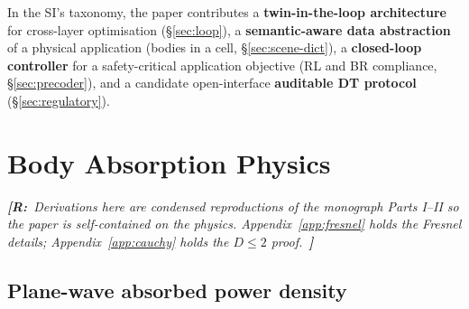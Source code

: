 \documentclass[journal,twocolumn,10pt]{IEEEtran}
\theoremstyle{definition}
\newcommand{\robinnote}[1]{%
  {\color{red!75!black}\textit{\textbf{[R:}~#1~\textbf{]}}}}
\begin{document}
In the SI's taxonomy, the paper contributes a
\textbf{twin-in-the-loop architecture} for cross-layer
optimisation (\S\ref{sec:loop}), a \textbf{semantic-aware data
abstraction} of a physical application (bodies in a cell,
\S\ref{sec:scene-dict}), a \textbf{closed-loop controller} for a
safety-critical application objective (RL and BR compliance,
\S\ref{sec:precoder}), and a candidate open-interface
\textbf{auditable DT protocol} (\S\ref{sec:regulatory}).

\section{Body Absorption Physics}\label{sec:physics}

\robinnote{Derivations here are condensed reproductions of the
monograph Parts I--II so the paper is self-contained on the
physics. Appendix~\ref{app:fresnel} holds the Fresnel details;
Appendix~\ref{app:cauchy} holds the $D\le 2$ proof.}

\subsection{Plane-wave absorbed power density}\label{sec:plane-wave}
\end{document}

